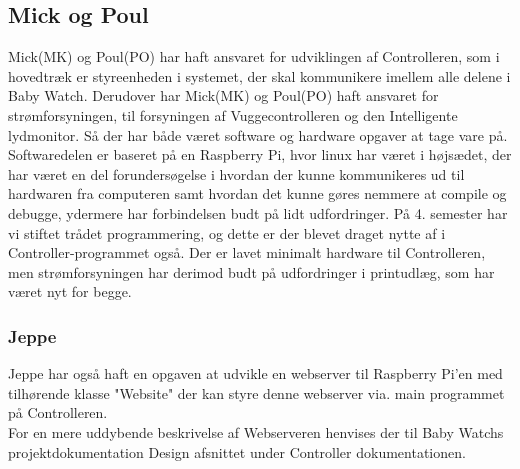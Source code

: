 \subsection*{Mick og Poul}
Mick(MK) og Poul(PO) har haft ansvaret for udviklingen af Controlleren, som i hovedtræk er styreenheden i systemet, der skal kommunikere imellem alle delene i Baby Watch. Derudover har Mick(MK) og Poul(PO) haft ansvaret for strømforsyningen, til forsyningen af Vuggecontrolleren og den Intelligente lydmonitor. Så der har både været software og hardware opgaver at tage vare på. Softwaredelen er baseret på en Raspberry Pi, hvor linux har været i højsædet, der har været en del forundersøgelse i hvordan der kunne kommunikeres ud til hardwaren fra computeren samt hvordan det kunne gøres nemmere at compile og debugge, ydermere har \iic forbindelsen budt på lidt udfordringer. På 4. semester har vi stiftet trådet programmering, og dette er der blevet draget nytte af i Controller-programmet også. Der er lavet minimalt hardware til Controlleren, men strømforsyningen har derimod budt på udfordringer i printudlæg, som har været nyt for begge.

\subsubsection*{Jeppe}
Jeppe har også haft en opgaven at udvikle en webserver til Raspberry Pi'en med tilhørende klasse "Website" der kan styre denne webserver via. main programmet på Controlleren. \\
For en mere uddybende beskrivelse af Webserveren henvises der til Baby Watchs projektdokumentation Design afsnittet under Controller dokumentationen.